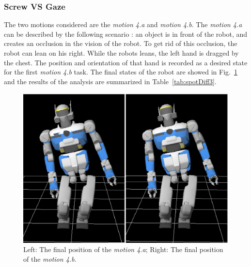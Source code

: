 \documentclass[letterpaper, 10pt, conference]{ieeeconf}      %
\begin{document}
\subsubsection{Screw VS Gaze}
\label{sec:distinc3}
The two motions considered are the \emph{motion 4.a} and \emph{motion 4.b}.
The \emph{motion 4.a} can be described by the following scenario :
an object is in front of the robot, and creates an occlusion in the vision of the robot.
To get rid of this occlusion, the robot can lean on his right. 
While the robots leans, the left hand is dragged by the chest.
The position and orientation of that hand is recorded as a desired state for the first \emph{motion 4.b} task.
The final states of the robot are showed in Fig.~\ref{fig:spotDiff3}
and the results of the analysis are summarized in Table~\ref{tab:spotDiff3}.
\begin{figure}[t]
\begin{center}
\includegraphics[width=0.66\linewidth]{img/spotDiff3.ps}
\end{center}
\caption{Left: The final position of the \emph{motion 4.a}; Right: The final position of the \emph{motion 4.b}.}
\label{fig:spotDiff3}
\end{figure}
\end{document}
